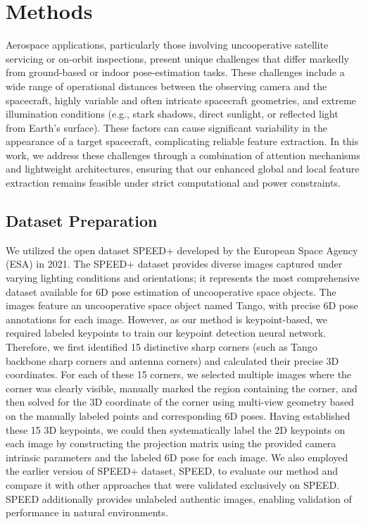 \documentclass[a4paper,fleqn]{cas-sc}
\begin{document}
\section{Methods}\label{sec:method}
Aerospace applications, particularly those involving uncooperative satellite servicing or on-orbit inspections, present unique challenges that differ markedly from ground-based or indoor pose-estimation tasks. These challenges include a wide range of operational distances between the observing camera and the spacecraft, highly variable and often intricate spacecraft geometries, and extreme illumination conditions (e.g., stark shadows, direct sunlight, or reflected light from Earth's surface). These factors can cause significant variability in the appearance of a target spacecraft, complicating reliable feature extraction. In this work, we address these challenges through a combination of attention mechanisms and lightweight architectures, ensuring that our enhanced global and local feature extraction remains feasible under strict computational and power constraints.

\subsection{Dataset Preparation}
We utilized the open dataset SPEED+ \citep{speed+} developed by the European Space Agency (ESA) in 2021. The SPEED+ dataset provides diverse images captured under varying lighting conditions and orientations; it represents the most comprehensive dataset available for 6D pose estimation of uncooperative space objects. The images feature an uncooperative space object named Tango, with precise 6D pose annotations for each image. However, as our method is keypoint-based, we required labeled keypoints to train our keypoint detection neural network. Therefore, we first identified 15 distinctive sharp corners (such as Tango backbone sharp corners and antenna corners) and calculated their precise 3D coordinates. For each of these 15 corners, we selected multiple images where the corner was clearly visible, manually marked the region containing the corner, and then solved for the 3D coordinate of the corner using multi-view geometry based on the manually labeled points and corresponding 6D poses. Having established these 15 3D keypoints, we could then systematically label the 2D keypoints on each image by constructing the projection matrix using the provided camera intrinsic parameters and the labeled 6D pose for each image. We also employed the earlier version of SPEED+ dataset, SPEED, to evaluate our method and compare it with other approaches that were validated exclusively on SPEED. SPEED additionally provides unlabeled authentic images, enabling validation of performance in natural environments.
\end{document}
